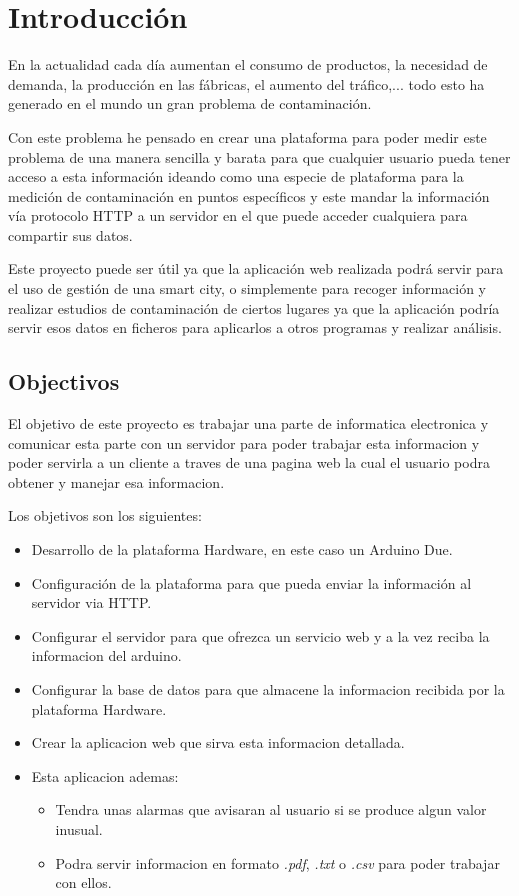 
\chapter{Introducción}

	En la actualidad cada día aumentan el consumo de productos, la necesidad de demanda, la producción en las fábricas, el aumento del tráfico,... todo esto ha generado en el mundo un gran problema de contaminación.
	
	Con este problema he pensado en crear una plataforma para poder medir este problema de una manera sencilla y barata para que cualquier usuario pueda tener acceso a esta información ideando como una especie de plataforma para la medición de contaminación en puntos específicos y este mandar la información vía protocolo HTTP a un servidor en el que puede acceder cualquiera para compartir sus datos.
	
	Este proyecto puede ser útil ya que la aplicación web realizada podrá servir para el uso de gestión de una smart city, o simplemente para recoger información y realizar estudios de contaminación de ciertos lugares ya que la aplicación podría servir esos datos en ficheros para aplicarlos a otros programas y realizar análisis.

\section{Objectivos}

El objetivo de este proyecto es trabajar una parte de informatica electronica y comunicar esta parte con un servidor para poder trabajar esta informacion y poder servirla a un cliente a traves de una pagina web la cual el usuario podra obtener y manejar esa informacion.

Los objetivos son los siguientes:

\begin{itemize}
\item Desarrollo de la plataforma Hardware, en este caso un Arduino Due.
\item Configuración de la plataforma para que pueda enviar la información al servidor via HTTP.
\item Configurar el servidor para que ofrezca un servicio web y a la vez reciba la informacion del arduino.
\item Configurar la base de datos para que almacene la informacion recibida por la plataforma Hardware.
\item Crear la aplicacion web que sirva esta informacion detallada.
\item Esta aplicacion ademas:
	\begin{itemize}
	\item Tendra unas alarmas que avisaran al usuario si se produce algun valor inusual.
	\item Podra servir informacion en formato \textit{.pdf}, \textit{.txt} o \textit{.csv} para poder trabajar con ellos.
	
	\end{itemize}
\end{itemize}


